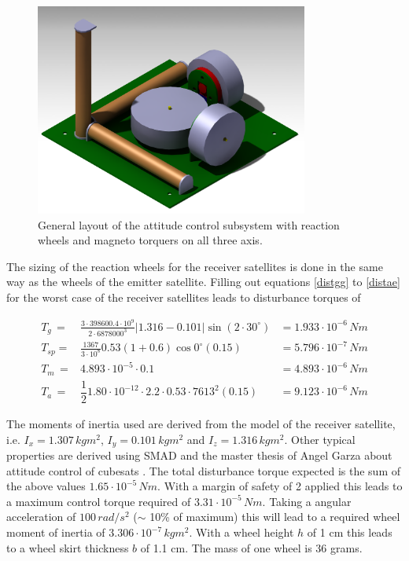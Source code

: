 \begin{figure} [h]
\centering
\includegraphics[width=0.8\textwidth]{chapters/img/AC_setup.png}
\caption[General layout of the attitude control subsystem]{General layout of the attitude control subsystem with reaction wheels and magneto torquers on all three axis.}
\label{fig:catacs}
\end{figure}

The sizing of the reaction wheels for the receiver satellites is done in the same way as the wheels of the emitter satellite. Filling out equations \ref{distgg} to \ref{distae} for the worst case of the receiver satellites leads to disturbance torques of 

\begin{eqnarray*}
T_g \,=& \frac{3\cdot 398600.4\cdot 10^9}{2\cdot 6878000^3} \left| 1.316 - 0.101 \right| \sin{\left(2\cdot 30^\circ \right)} &= 1.933\cdot 10^{-6}\,Nm\\
T_{sp} =& \frac{1367}{3\cdot 10^8}0.53\left(1+0.6\right)\cos{0^\circ}\left(0.15\right) &= 5.796 \cdot 10^{-7}\,Nm\\
T_m \,=& 4.893\cdot 10^{-5} \cdot 0.1  &= 4.893 \cdot 10^{-6}\,Nm\\
T_a \,=& \dfrac{1}{2} 1.80 \cdot 10^{-12}\cdot 2.2\cdot 0.53 \cdot 7613^2 \left(0.15\right) &= 9.123 \cdot 10^{-6}\,Nm
\end{eqnarray*}

The moments of inertia used are derived from the model of the receiver satellite, i.e. $I_x = 1.307\,kgm^2$,  $I_y = 0.101\,kgm^2$ and $I_z = 1.316\,kgm^2$. Other typical properties are derived using SMAD \cite{larson} and the master thesis of Angel Garza about attitude control of cubesats  \cite{wheelmotor}. The total disturbance torque expected is the sum of the above values $1.65 \cdot 10^{-5}\,Nm$. With a margin of safety of 2 applied this leads to a maximum control torque required of $3.31\cdot 10^{-5}\, Nm$. Taking a angular acceleration of $100\,rad/s^2$ ($\sim$ 10\% of maximum) this will lead to a required wheel moment of inertia of $3.306\cdot 10^{-7}\,kgm^2$. With a wheel height $h$ of 1 cm this leads to a wheel skirt thickness $b$ of 1.1 cm. The mass of one wheel is 36 grams.

